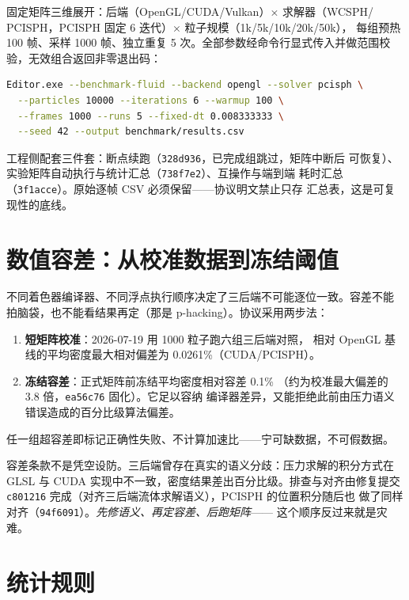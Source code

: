 固定矩阵三维展开：后端（OpenGL/CUDA/Vulkan）$\times$ 求解器（WCSPH/
PCISPH，PCISPH 固定 6 迭代）$\times$ 粒子规模（1k/5k/10k/20k/50k），
每组预热 100 帧、采样 1000 帧、独立重复 5 次。全部参数经命令行显式传入并做范围校验，无效组合返回非零退出码：

\begin{lstlisting}[language=bash]
Editor.exe --benchmark-fluid --backend opengl --solver pcisph \
  --particles 10000 --iterations 6 --warmup 100 \
  --frames 1000 --runs 5 --fixed-dt 0.008333333 \
  --seed 42 --output benchmark/results.csv
\end{lstlisting}

工程侧配套三件套：断点续跑（\texttt{328d936}，已完成组跳过，矩阵中断后
可恢复）、实验矩阵自动执行与统计汇总（\texttt{738f7e2}）、互操作与端到端
耗时汇总（\texttt{3f1acce}）。原始逐帧 CSV 必须保留——协议明文禁止只存
汇总表，这是可复现性的底线。

\section{数值容差：从校准数据到冻结阈值}

不同着色器编译器、不同浮点执行顺序决定了三后端不可能逐位一致。容差不能
拍脑袋，也不能看结果再定（那是 p-hacking）。协议采用两步法：

\begin{enumerate}
  \item \textbf{短矩阵校准}：2026-07-19 用 1000 粒子跑六组三后端对照，
        相对 OpenGL 基线的平均密度最大相对偏差为 0.0261\%（CUDA/PCISPH）。
  \item \textbf{冻结容差}：正式矩阵前冻结平均密度相对容差 0.1\%
        （约为校准最大偏差的 3.8 倍，\texttt{ea56c76} 固化）。它足以容纳
        编译器差异，又能拒绝此前由压力语义错误造成的百分比级算法偏差。
\end{enumerate}

任一组超容差即标记正确性失败、不计算加速比——宁可缺数据，不可假数据。

容差条款不是凭空设防。三后端曾存在真实的语义分歧：压力求解的积分方式在
GLSL 与 CUDA 实现中不一致，密度结果差出百分比级。排查与对齐由修复提交
\texttt{c801216} 完成（对齐三后端流体求解语义），PCISPH 的位置积分随后也
做了同样对齐（\texttt{94f6091}）。\emph{先修语义、再定容差、后跑矩阵}——
这个顺序反过来就是灾难。

\section{统计规则}

